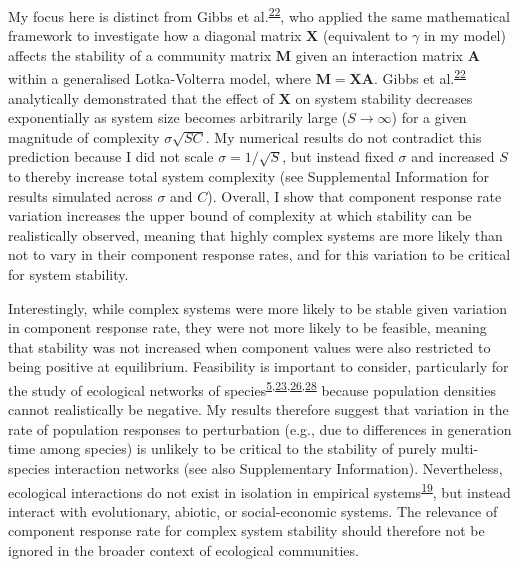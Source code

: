 \documentclass[]{article}
\begin{document}
My focus here is distinct from Gibbs et
al.\textsuperscript{\protect\hyperlink{ref-Gibbs2017}{22}}, who applied
the same mathematical framework to investigate how a diagonal matrix
\(\mathbf{X}\) (equivalent to \(\gamma\) in my model) affects the
stability of a community matrix \(\mathbf{M}\) given an interaction
matrix \(\mathbf{A}\) within a generalised Lotka-Volterra model, where
\(\mathbf{M} = \mathbf{XA}\). Gibbs et
al.\textsuperscript{\protect\hyperlink{ref-Gibbs2017}{22}} analytically
demonstrated that the effect of \(\mathbf{X}\) on system stability
decreases exponentially as system size becomes arbitrarily large
(\(S \to \infty\)) for a given magnitude of complexity
\(\sigma\sqrt{SC}\). My numerical results do not contradict this
prediction because I did not scale \(\sigma = 1 / \sqrt{S}\), but
instead fixed \(\sigma\) and increased \(S\) to thereby increase total
system complexity (see Supplemental Information for results simulated
across \(\sigma\) and \(C\)). Overall, I show that component response
rate variation increases the upper bound of complexity at which
stability can be realistically observed, meaning that highly complex
systems are more likely than not to vary in their component response
rates, and for this variation to be critical for system stability.

Interestingly, while complex systems were more likely to be stable given
variation in component response rate, they were not more likely to be
feasible, meaning that stability was not increased when component values
were also restricted to being positive at equilibrium. Feasibility is
important to consider, particularly for the study of ecological networks
of
species\textsuperscript{\protect\hyperlink{ref-Grilli2017}{5},\protect\hyperlink{ref-Stone2017}{23},\protect\hyperlink{ref-Dougoud2018}{26},\protect\hyperlink{ref-Servan2018}{28}}
because population densities cannot realistically be negative. My
results therefore suggest that variation in the rate of population
responses to perturbation (e.g., due to differences in generation time
among species) is unlikely to be critical to the stability of purely
multi-species interaction networks (see also Supplementary Information).
Nevertheless, ecological interactions do not exist in isolation in
empirical
systems\textsuperscript{\protect\hyperlink{ref-Patel2018}{19}}, but
instead interact with evolutionary, abiotic, or social-economic systems.
The relevance of component response rate for complex system stability
should therefore not be ignored in the broader context of ecological
communities.
\end{document}

